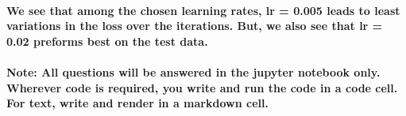 \documentclass[11pt]{article}
\begin{document}
    \paragraph{We see that among the chosen learning rates, lr = 0.005 leads
to least variations in the loss over the iterations. But, we also see
that lr = 0.02 preforms best on the test
data.}\label{we-see-that-among-the-chosen-learning-rates-lr-0.005-leads-to-least-variations-in-the-loss-over-the-iterations.-but-we-also-see-that-lr-0.02-preforms-best-on-the-test-data.}

    \paragraph{Note: All questions will be answered in the jupyter notebook
only. Wherever code is required, you write and run the code in a code
cell. For text, write and render in a markdown
cell.}\label{note-all-questions-will-be-answered-in-the-jupyter-notebook-only.-wherever-code-is-required-you-write-and-run-the-code-in-a-code-cell.-for-text-write-and-render-in-a-markdown-cell.}


    
    
    
    
\end{document}
